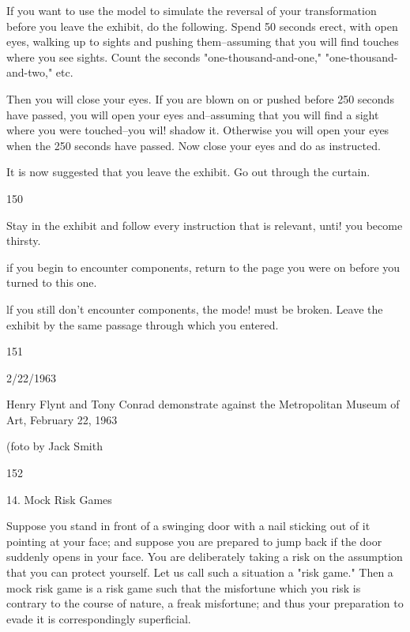 \documentclass[10pt,twoside]{memoir}
\begin{document}
\begin{enumerate}
{\begin{enumerate}
\begin{sysrules}
\begin{sysrules}
\begin{sysrules}
\begin{sysrules}
{\begin{enumerate}
{{{{{{{If you want to use the model to simulate the reversal of your 
transformation before you leave the exhibit, do the following. Spend 50 
seconds erect, with open eyes, walking up to sights and pushing 
them--assuming that you will find touches where you see sights. Count the 
seconds "one-thousand-and-one," "one-thousand-and-two," etc. 


Then you will close your eyes. If you are blown on or pushed before 
250 seconds have passed, you will open your eyes and--assuming that you 
will find a sight where you were touched--you wil! shadow it. Otherwise you 
will open your eyes when the 250 seconds have passed. Now close your eyes 
and do as instructed. 


It is now suggested that you leave the exhibit. Go out through the 
curtain. 


150 


Stay in the exhibit and follow every instruction that is relevant, unti! 
you become thirsty. 


if you begin to encounter components, return to the page you were on 
before you turned to this one. 


lf you still don't encounter components, the mode! must be broken. 
Leave the exhibit by the same passage through which you entered. 


151 


2/22/1963 


Henry Flynt and Tony Conrad demonstrate against the Metropolitan Museum of Art, 
February 22, 1963 


(foto by Jack Smith} 


152 


14. Mock Risk Games 


Suppose you stand in front of a swinging door with a nail sticking out of it 
pointing at your face; and suppose you are prepared to jump back if the 
door suddenly opens in your face. You are deliberately taking a risk on the 
assumption that you can protect yourself. Let us call such a situation a "risk 
game." Then a mock risk game is a risk game such that the misfortune which 
you risk is contrary to the course of nature, a freak misfortune; and thus 
your preparation to evade it is correspondingly superficial. 

}}}}}}
\end{enumerate}}
\end{sysrules}
\end{sysrules}
\end{sysrules}
\end{sysrules}
\end{enumerate}}
\end{enumerate}
\end{document}
